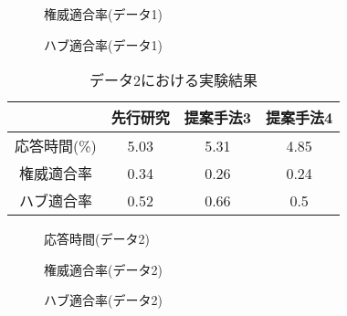 \documentclass[a4paper,11pt]{jreport}
\begin{document}
\begin{figure}[htbp]
\begin{center}
\end{center}
\caption{権威適合率(データ1)}
\label{figure:sample}
\end{figure}

\begin{figure}[htbp]
\begin{center}
\end{center}
\caption{ハブ適合率(データ1)}
\label{figure:sample}
\end{figure}

\clearpage

\begin{table}[htb]
\begin{center}
\caption{データ2における実験結果}
\begin{tabular}{|c||c|c|c|} \hline 
    & 先行研究 & 提案手法3 & 提案手法4 \\ \hline \hline
    応答時間(\%) & 5.03 & 5.31 & 4.85 \\  \hline
    権威適合率 & 0.34 & 0.26 & 0.24 \\ \hline
    ハブ適合率 & 0.52 & 0.66 & 0.5 \\ \hline
\end{tabular}
\end{center}
\end{table}

\begin{figure}[htbp]
\begin{center}
\end{center}
\caption{応答時間(データ2)}
\label{figure:sample}
\end{figure}

\begin{figure}[htbp]
\begin{center}
\end{center}
\caption{権威適合率(データ2)}
\label{figure:sample}
\end{figure}

\begin{figure}[htbp]
\begin{center}
\end{center}
\caption{ハブ適合率(データ2)}
\label{figure:sample}
\end{figure}
\end{document}
